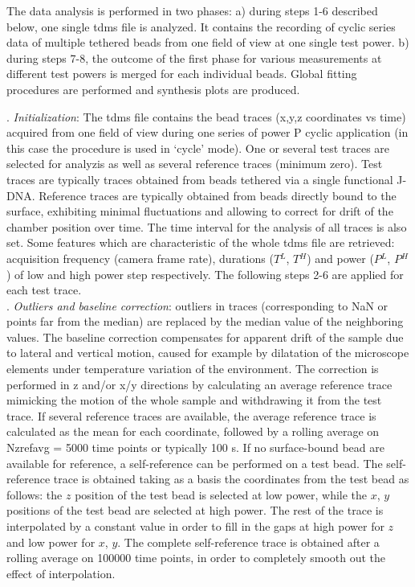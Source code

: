 \documentclass{biophys-new}
\begin{document}
The data analysis is performed in two phases: a) during steps 1-6 described below, one single tdms file is analyzed. It contains the recording of cyclic series data of multiple tethered beads from one field of view at one single test power. b) during steps 7-8, the outcome of the first phase for various measurements at different test powers is merged for each individual beads. Global fitting procedures are performed and synthesis plots are produced.

. \textit{ Initialization}: %
The tdms file contains the bead traces (x,y,z coordinates vs time) acquired from one field of view during one series of power P cyclic application (in this case the procedure is used in ‘cycle’ mode). One or several test traces are selected for analyzis as well as several reference traces (minimum zero). Test traces are typically traces obtained from beads tethered via a single functional J-DNA. Reference traces are typically obtained from beads directly bound to the surface, exhibiting minimal fluctuations and allowing to correct for drift of the chamber position over time. The time interval for the analysis of all traces is also set. Some features which are characteristic of the whole tdms file are retrieved: acquisition frequency (camera frame rate), durations ($T{^L}$, $T{^H}$) and power ($P{^L}$, $P{^H}$) of low and high power step respectively. The following steps 2-6 are applied for each test trace.\\

.\textit{ Outliers and baseline correction}: outliers in traces (corresponding to NaN or points far from the median) are replaced by the median value of the neighboring values. The baseline correction compensates for apparent drift of the sample due to lateral and vertical motion, caused for example by dilatation of the microscope elements under temperature variation of the environment. The correction is performed in z and/or x/y directions by calculating an average reference trace mimicking the motion of the whole sample and withdrawing it from the test trace. If several reference traces are available, the average reference trace is calculated as the mean for each coordinate, followed by a rolling average on Nzrefavg = 5000 time points or typically 100 s. If no surface-bound bead are available for reference, a self-reference can be performed on a test bead. The self-reference trace is obtained taking as a basis the coordinates from the test bead as follows: the $z$ position of the test bead is selected at low power, while the $x$, $y$ positions of the test bead are selected at high power. %
The rest of the trace is interpolated by a constant value in order to fill in the gaps at high power for $z$ and low power for $x$, $y$. The complete self-reference trace is obtained after a rolling average on 100000 time points, in order to completely smooth out the effect of interpolation.\\
\end{document}
